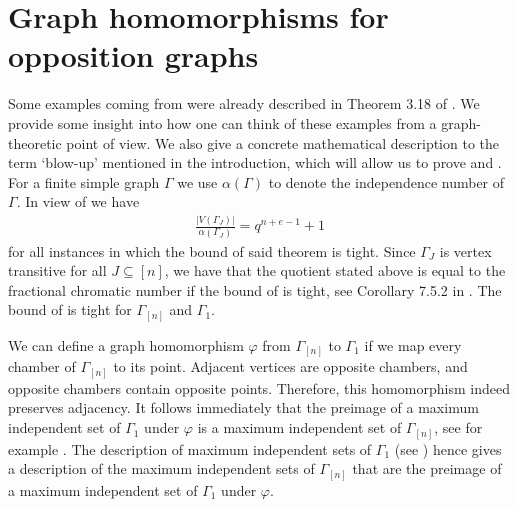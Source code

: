 \documentclass[11pt]{article}
\newcommand{\red}[1]{\textcolor{red}{#1}}
\newcommand{\philipp}[1]{\textcolor{blue}{#1}}
\newcommand{\rem}[1]{\textcolor{red}{\sout{#1}}}
\begin{document}
\section{Graph homomorphisms for opposition graphs}
\label{Subsection: Maximal examples}


 Some examples coming from  were already described in Theorem 3.18 of \cite{AlgebraicApproach}. We provide some insight into how one can think of these examples from a graph-theoretic point of view. We also give a concrete mathematical description to the term `blow-up' mentioned in the introduction, which will allow us to prove  and . \\

For a finite simple graph $\Gamma$ we use $\alpha(\Gamma)$ to denote the independence number of $\Gamma$. In view of  we have
\begin{align*}
    \frac{|V(\Gamma_J)|}{\alpha(\Gamma_J)}=q^{n+e-1}+1
\end{align*}
for all instances in which the bound of said theorem is tight. Since $\Gamma_J$ is vertex transitive for all $J \subseteq [n]$, we have that the quotient stated above is equal to the fractional chromatic number if the bound of  is tight, see Corollary 7.5.2 in \cite{algebraic_graph_theory}. The bound of  is tight for $\Gamma_{[n]}$ and $\Gamma_1$. %


We can define a graph homomorphism $\varphi$ from $\Gamma_{[n]}$ to $\Gamma_1$ if we map every chamber of $\Gamma_{[n]}$ to its point. Adjacent vertices are opposite chambers, and opposite chambers contain opposite points. Therefore, this homomorphism indeed preserves adjacency. It follows immediately that the preimage of a maximum independent set of $\Gamma_1$ under $\varphi$ is a maximum independent set of $\Gamma_{[n]}$, see for example \cite[Lemma 7.5.4]{algebraic_graph_theory}. 
The description of maximum independent sets of $\Gamma_1$ (see ) hence gives a description of the maximum independent sets of $\Gamma_{[n]}$ that are the preimage of a maximum independent set of $\Gamma_1$ under $\varphi$.
\end{document}
